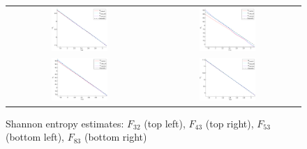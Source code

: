 \begin{figure}[H]
\centering
\begin{tabular}{cc}
\includegraphics[width=0.4\textwidth]{images4/frac32si.pdf} &
\includegraphics[width=0.4\textwidth]{images4/frac43si.pdf} \\
\includegraphics[width=0.4\textwidth]{images4/frac53si.pdf} &
\includegraphics[width=0.4\textwidth]{images4/frac83si.pdf}
\end{tabular}
\caption{Shannon entropy estimates: $F_{32}$ (top left), $F_{43}$ (top right), $F_{53}$ (bottom left), $F_{83}$ (bottom right) }
\label{fig:fracshan}
\end{figure}